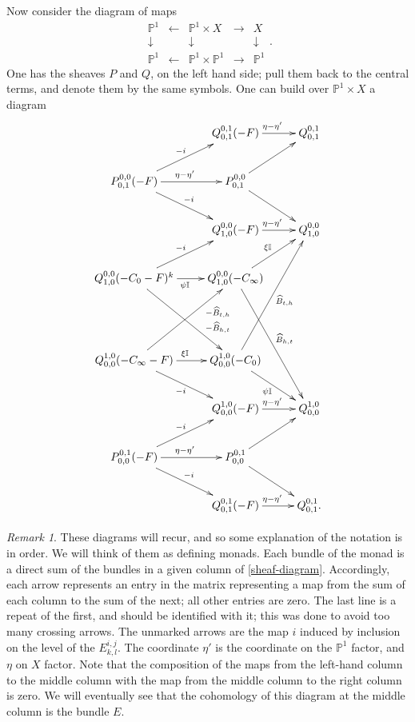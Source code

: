 \documentclass[12pt]{article}
\theoremstyle{definition}
\theoremstyle{remark}
\newtheorem{remark}[theorem]{Remark}
\numberwithin{theorem}{section}
\def\bP{{\mathbb {P}}}
\def\bI{{\mathbb {I}}}
\begin{document}
Now consider the diagram of maps
\begin{equation}\label{updown}\begin{matrix} \bP^1&\leftarrow&\bP^1\times X&\rightarrow&X\\
\downarrow &&\downarrow&&\downarrow\\
 \bP^1&\leftarrow&\bP^1\times \bP^1&\rightarrow&\bP^1\end{matrix}.\end{equation}
 One has the sheaves $P$ and $Q$, on the left hand side; pull them back to the central terms, and denote them by the same symbols. One can build over $\bP^1\times X$ a diagram
  \begin{equation} \label{sheaf-diagram}\xymatrix{ &Q_{0,1}^{0,1}(-F)\ar[r]^{\eta-\eta'}&Q_{0,1}^{0,1}\\P^{0,0}_{0,1}(-F)\ar[r]^{\eta -\eta' }\ar[ur]^{-i}\ar[dr]^{-i}&P^{0,0}_{0,1}\ar[ur]\ar[dr]  \\&Q_{ 1,0}^{0,0} (-F)\ar[r]^{\eta-\eta'}&Q_{ 1,0}^{0,0} \\
  Q_{ 1,0}^{0,0}( -C_0-F)^{k} \ar[ur]^{-i}\ar[ddr]^(0.7){ -\widehat B_{h,t}}\ar[r]_(0.5){\psi\bI} &  Q_{ 1,0}^{0,0}(-C_\infty ) \ar[ur]^{\xi\bI}\ar[dddr]^{\widehat B_{h,t}} &   \\
 &&   \\
Q_{0 ,0}^{ 1,0} (-C_\infty-F) \ar[dr]_{-i} \ar[uur]_(0.7){ -\widehat B_{t,h}}\ar[r]^(0.5){\xi\bI} &  Q_{0 ,0}^{ 1,0} (-C_0 ) \ar[uuur]_{\widehat B_{t,h}}\ar[dr]_{\psi\bI} \\
  &Q_{0,0}^{1,0}(-F)\ar[r]^{\eta-\eta'}&Q_{0,0}^{1,0}\\P^{0,1}_{0,0}(-F)\ar[r]^{\eta-\eta'}\ar[ur]^{-i} \ar[dr]^{-i} &P^{0,1}_{0,0}\ar[ur] \ar[dr] \\&Q_{0,1}^{0,1}(-F)\ar[r]^{\eta-\eta'}&Q_{0,1}^{0,1}.
}
\end{equation} 
\begin{remark} \label {monad diagrams} These diagrams will recur, and so some explanation of the notation is in order. We will think of them as defining monads.
Each bundle  of the monad is a direct sum of the bundles in a given column of \eqref{sheaf-diagram}.
 Accordingly, each arrow represents an entry in the matrix representing a map from the sum of each column to the sum of the next; all other entries are zero. The last line is a repeat of the first, and should be identified with it; this was done to  avoid too many crossing arrows. The unmarked arrows are the map $i$ induced by inclusion on the level of the $E^{i,j}_{k,l}$.  The coordinate $\eta'$ is the coordinate on the $\bP^1$ factor, and $\eta$ on $X$ factor. Note that the composition of the maps from the left-hand column to the middle column with the map from the middle column to the right column is zero. We will eventually see that the cohomology of this diagram at the middle column is the bundle $E$.\end{remark}
\end{document}
